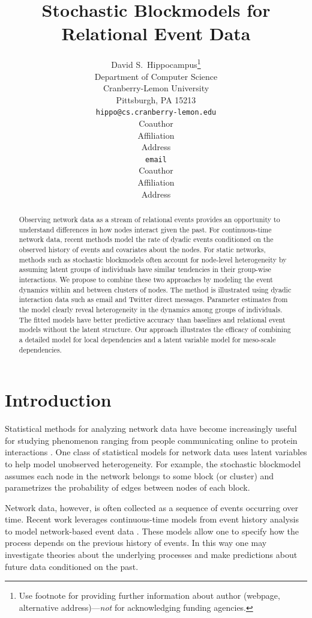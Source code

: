 \documentclass{article}
\title{Stochastic Blockmodels for Relational Event Data}
\author{
David S.~Hippocampus\thanks{ Use footnote for providing further information
about author (webpage, alternative address)---\emph{not} for acknowledging
funding agencies.} \\
Department of Computer Science\\
Cranberry-Lemon University\\
Pittsburgh, PA 15213 \\
\texttt{hippo@cs.cranberry-lemon.edu} \\
\And
Coauthor \\
Affiliation \\
Address \\
\texttt{email} \\
\AND
Coauthor \\
Affiliation \\
Address \\
}
\begin{document}
 

\maketitle

\begin{abstract}
Observing network data as a stream of relational events provides an
opportunity to understand differences in how nodes interact given the
past.  For continuous-time network data, recent methods model the rate of dyadic events conditioned on the observed history of events and covariates about the nodes.  For static networks, methods such as stochastic blockmodels often account for node-level heterogeneity by assuming latent groups of individuals have similar tendencies in their group-wise interactions.  We propose to combine these two approaches by modeling the event dynamics within and between clusters of nodes.  The method is illustrated using dyadic interaction data such as email and Twitter direct messages.  Parameter estimates from the model clearly reveal heterogeneity in the dynamics among groups of individuals.  The fitted models have better predictive accuracy than baselines and relational event models without the latent structure.  Our approach illustrates the efficacy of combining a detailed model for local dependencies and a latent variable model for meso-scale dependencies.
\end{abstract}

\section{Introduction}

Statistical methods for analyzing network data have become increasingly useful for studying  phenomenon ranging from people communicating online to protein interactions \cite{Goldenberg2009}.  One class of statistical models for network data uses latent variables to help model unobserved heterogeneity.  For example, the stochastic blockmodel \cite{Nowicki2001, Kemp, Ishiguro2010} assumes each node in the network belongs to some block (or cluster) and parametrizes the probability of edges between nodes of each block.  %

Network data, however, is often collected as a sequence of events occurring over time.   Recent work leverages  continuous-time models from event history analysis  \cite{AalenOddO.2008} to model network-based event data \cite{Butts2008,Brandes2009,Perry2011,Stadtfeld2010,Stadtfeld2011,Opsahl2011,Vu2011,Vu2011a}.  These models allow one to specify how the process depends on the previous history of events.  In this way one may investigate theories about the underlying processes and make predictions about future data conditioned on the past.
\end{document}
